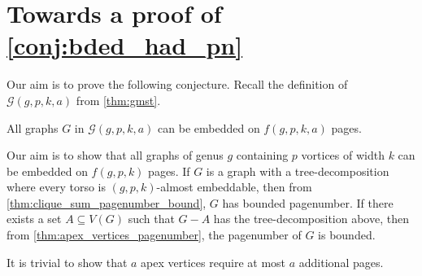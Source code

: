 
\newcommand{\gpk}{12gpk + 12gp + 18g + 12kp + 12p + 11}
\chapter{Towards a proof of \cref{conj:bded_had_pn}}\label{chap:Proving_The_Theorem}
Our aim is to prove the following conjecture. Recall the definition of $\mathcal{G}(g, p, k, a)$ from \cref{thm:gmst}. 
\begin{conjecture}\label{conj:gmst_conjecture_pagenumber}
	All graphs $G$ in $\mathcal{G}(g, p, k, a)$ can be embedded on \(f(g, p, k, a)\) pages.
\end{conjecture}
Our aim is to show that all graphs of genus \(g\) containing \(p\) vortices of width \(k\) can be embedded on \(f(g, p, k)\) pages. If $G$ is a graph with a tree-decomposition where every torso is $(g, p, k)$-almost embeddable, then from \cref{thm:clique_sum_pagenumber_bound}, $G$ has bounded pagenumber. If there exists a set $A \subseteq V(G)$ such that $G - A$ has the tree-decomposition above, then from \cref{thm:apex_vertices_pagenumber}, the pagenumber of $G$ is bounded.

It is trivial to show that $a$ apex vertices require at most $a$ additional pages.
















